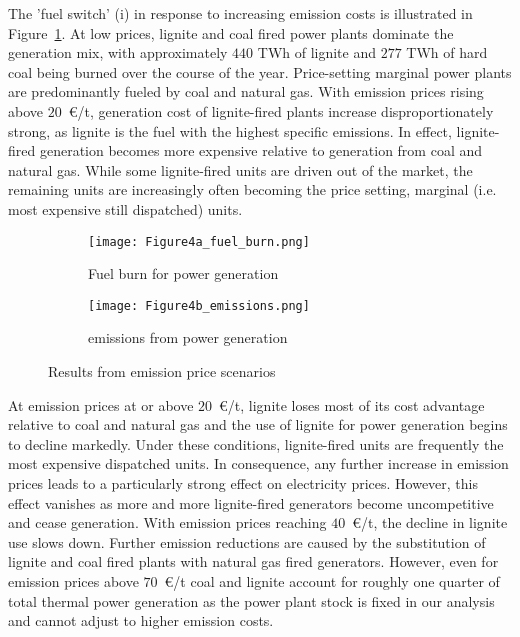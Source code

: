 \documentclass[preprint, 12pt, authoryear]{elsarticle}
\begin{document}
The 'fuel switch' (i) in response to increasing emission costs is illustrated in Figure~\ref{Fig4a}.
At low  prices, lignite and coal fired power plants dominate the generation mix, with approximately $440$ TWh of lignite and $277$ TWh of hard coal  being burned over the course of the year.
Price-setting marginal power plants are predominantly fueled by coal and natural gas.
With emission prices rising above $20$~\euro{}/t, generation cost of lignite-fired plants increase disproportionately strong, as lignite is the fuel with the highest specific  emissions. 
In effect, lignite-fired generation becomes more expensive relative to generation from coal and natural gas.
While some lignite-fired units are driven out of the market, the remaining units are increasingly often becoming the price setting, marginal (i.e. most expensive still dispatched) units.

\begin{figure}[t]
\centering
\begin{subfigure}[t]{0.475\textwidth}
\centering
\texttt{[image: Figure4a\_fuel\_burn.png]}
\caption{Fuel burn for power generation} \label{Fig4a}
\end{subfigure}
\begin{subfigure}[t]{0.475\textwidth}
\centering
\texttt{[image: Figure4b\_emissions.png]}
\caption{ emissions from power generation}\label{Fig4b}
\end{subfigure}
\caption{Results from emission price scenarios}\label{Fig4}
\end{figure}

At emission prices at or above $20$~\euro{}/t, lignite loses most of its cost advantage relative to coal and natural gas and the use of lignite for power generation begins to decline markedly.
Under these conditions, lignite-fired units are frequently the most expensive dispatched units.
In consequence, any further increase in  emission prices leads to a particularly strong effect on electricity prices.
However, this effect vanishes as more and more lignite-fired generators become uncompetitive and cease generation.
With  emission prices reaching $40$~\euro{}/t, the decline in lignite use slows down.
Further emission reductions are caused by the substitution of lignite and coal fired plants with natural gas fired generators.
However, even for emission prices above $70$~\euro{}/t coal and lignite account for roughly one quarter of total thermal power generation as the power plant stock is fixed in our analysis and cannot adjust to higher  emission costs.
\end{document}
